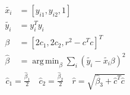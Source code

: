 \documentclass[11pt]{article}
\DeclareMathOperator*{\argmin}{arg\,min}
\begin{document}
    \begin{equation*}
      \begin{align*}
        \tilde{x_i} &= [y_{i1}, y_{i2},1] \\
        \tilde{y_i} &= y_i^Ty_i \\
        \beta &= [2c_1, 2c_2, r^2-c^Tc]^T \\
        \hat{\beta} &= \argmin_{\beta} \sum_i (\tilde{y_i}-\tilde{x_i}\beta)^2
      \end{align*}
    \end{equation*}
    \begin{equation*}
      \begin{align*}
        \hat{c}_1 = \frac{\hat{\beta}_1}{2} \quad \hat{c}_2 = \frac{\hat{\beta}_2}{2}
        \quad \hat{r}=\sqrt{\hat{\beta}_3+\hat{c}^T\hat{c}}
      \end{align*}
    \end{equation*}
\end{document}
